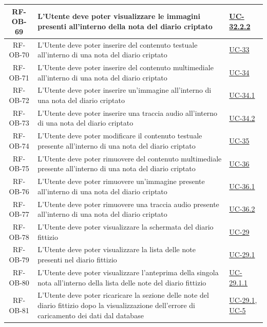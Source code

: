 \documentclass[a4paper,12pt]{article}
\begin{document}
\begin{center}
\begin{longtable}{|c|p{8.5cm}|>{\centering\arraybackslash}p{4cm}|}
\rowcolor{white}
RF-OB-69 & L'Utente deve poter visualizzare le immagini presenti all'interno della nota del diario criptato & \hyperref[subsec:UC-32.2.2]{UC-32.2.2} \\
\hline
\rowcolor{gray!20}
RF-OB-70 & L'Utente deve poter inserire del contenuto testuale all'interno di una nota del diario criptato & \hyperref[subsec:UC-33]{UC-33} \\
\hline
\rowcolor{white}
RF-OB-71 & L'Utente deve poter inserire del contenuto multimediale all'interno di una nota del diario criptato & \hyperref[subsec:UC-34]{UC-34} \\
\hline
\rowcolor{gray!20}
RF-OB-72 & L'Utente deve poter inserire un'immagine all'interno di una nota del diario criptato & \hyperref[subsec:UC-34.1]{UC-34.1} \\
\hline
\rowcolor{white}
RF-OB-73 & L'Utente deve poter inserire una traccia audio all'interno di una nota del diario criptato & \hyperref[subsec:UC-34.2]{UC-34.2} \\
\hline
\rowcolor{gray!20}
RF-OB-74 & L'Utente deve poter modificare il contenuto testuale presente all'interno di una nota del diario criptato & \hyperref[subsec:UC-35]{UC-35} \\
\hline
\rowcolor{white}
RF-OB-75 & L'Utente deve poter rimuovere del contenuto multimediale presente all'interno di una nota del diario criptato & \hyperref[subsec:UC-36]{UC-36} \\
\hline
\rowcolor{gray!20}
RF-OB-76 & L'Utente deve poter rimuovere un'immagine presente all'interno di una nota del diario criptato & \hyperref[subsec:UC-36.1]{UC-36.1} \\
\hline
\rowcolor{white}
RF-OB-77 & L'Utente deve poter rimuovere una traccia audio presente all'interno di una nota del diario criptato & \hyperref[subsec:UC-36.2]{UC-36.2} \\
\hline
\rowcolor{gray!20}
RF-OB-78 & L'Utente deve poter visualizzare la schermata del diario fittizio & \hyperref[subsec:UC-29]{UC-29} \\
\hline
\rowcolor{white}
RF-OB-79 & L'Utente deve poter visualizzare la lista delle note presenti nel diario fittizio & \hyperref[subsec:UC-29.1]{UC-29.1} \\
\hline
\rowcolor{gray!20}
RF-OB-80 & L'Utente deve poter visualizzare l'anteprima della singola nota all'interno della lista delle note del diario fittizio & \hyperref[subsec:UC-29.1.1]{UC-29.1.1} \\
\hline
\rowcolor{white}
RF-OB-81 & L'Utente deve poter ricaricare la sezione delle note del diario fittizio dopo la visualizzazione dell'errore di caricamento dei dati dal database & \hyperref[subsec:UC-29.1]{UC-29.1}, \hyperref[sec:UC-5]{UC-5} \\

\end{longtable}
\end{center}
\end{document}
